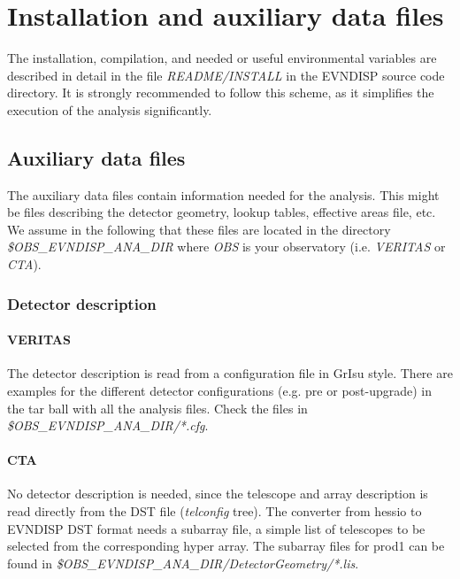 \documentclass[titlepage,a4paper,twoside,11pt]{report}
\begin{document}
\chapter{Installation and auxiliary data files}
\label{SECTION.ENVIRON}

The installation, compilation, and needed or useful environmental variables are described in detail in the file {\it README/INSTALL} in the EVNDISP source code directory.
It is strongly recommended to follow this scheme, as it simplifies the execution of the analysis significantly.


\section{Auxiliary data files}
\label{SECTION.AUXFILE}

The auxiliary data files contain information needed for the analysis. 
This might be files describing the detector geometry, lookup tables, effective areas file, etc.
We assume in the following that these files are located in the
directory {\it \$OBS\_EVNDISP\_ANA\_DIR} where {\it OBS} is your
observatory (i.e. {\it VERITAS} or {\it CTA}).

\subsection{Detector description}

\subsubsection{VERITAS}

The detector description is read from a configuration file in GrIsu style. There are examples for the different detector configurations (e.g. pre or post-upgrade) in 
the tar ball with all the analysis files. 
Check the files in  {\it \$OBS\_EVNDISP\_ANA\_DIR/*.cfg}.

\subsubsection{CTA}

No detector description is needed, since the telescope and array description is read directly from the DST file ({\it telconfig} tree).
The converter from hessio to EVNDISP DST format needs a subarray file, a simple list of telescopes to be selected from the corresponding hyper array. 
The subarray files for prod1 can be found in {\it \$OBS\_EVNDISP\_ANA\_DIR/DetectorGeometry/*.lis}.
\end{document}
